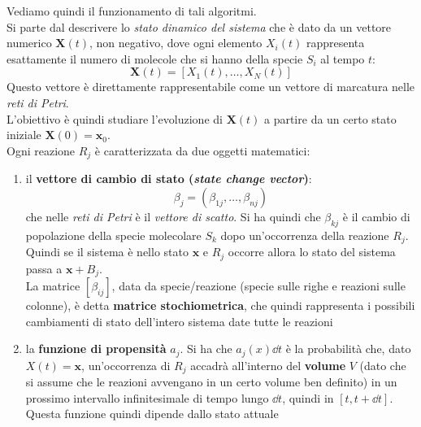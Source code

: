 \documentclass[a4paper,12pt, oneside]{book}
\begin{document}
Vediamo quindi il funzionamento di tali algoritmi.\\
Si parte dal descrivere lo \textit{stato dinamico del sistema} che è dato da un
vettore numerico $\mathbf{X}(t)$, non negativo, dove ogni elemento $X_i(t)$
rappresenta esattamente il numero di molecole che si hanno della specie $S_i$ al
tempo $t$: 
\[\mathbf{X}(t)=[X_1(t),\ldots, X_N(t)]\]
Questo vettore è direttamente rappresentabile come un vettore di marcatura nelle
\textit{reti di Petri}.\\
L'obiettivo è quindi studiare l'evoluzione di $\mathbf{X}(t)$ a partire da un
certo stato iniziale $\mathbf{X}(0)=\mathbf{x}_0$.\\
Ogni reazione $R_j$ è caratterizzata da due oggetti matematici:
\begin{enumerate}
  \item il \textbf{vettore di cambio di stato (\textit{state change vector})}:
  \[\beta_j=\left(\beta_{1j}, \ldots, \beta_{nj}\right)\]
  che nelle \textit{reti di Petri} è il \textit{vettore di scatto}. Si ha quindi
  che $\beta_{kj}$ è il cambio di popolazione della specie molecolare $S_k$ dopo
  un'occorrenza della reazione $R_j$. Quindi se il sistema è nello stato
  $\mathbf{x}$ e $R_j$ occorre allora lo stato del sistema passa a
  $\mathbf{x}+B_j$.\\ 
  La matrice $[\beta_{ij}]$, data da specie/reazione (specie sulle righe e
  reazioni sulle colonne), è detta \textbf{matrice stochiometrica}, che quindi
  rappresenta i possibili cambiamenti di stato dell'intero sistema date tutte le
  reazioni
  \item la \textbf{funzione di propensità} $a_j$. Si ha che $a_j(x) \dd{t}$ è la
  probabilità che, dato $X(t)=\mathbf{x}$, un'occorrenza di $R_j$ accadrà
  all'interno del \textbf{volume} $V$ (dato che si assume che le reazioni
  avvengano in un certo volume ben definito) in un prossimo intervallo
  infinitesimale di tempo lungo $\dd{t}$, quindi in $[t,t+\dd{t}]$. Questa
  funzione quindi dipende dallo stato attuale
\end{enumerate}
\end{document}
